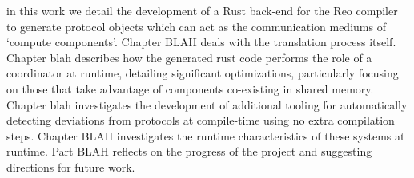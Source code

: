 {in this work we detail the development of a Rust back-end for the Reo compiler to generate protocol objects which can act as the communication mediums of `compute components'. Chapter BLAH deals with the translation process itself. Chapter blah describes how the generated rust code performs the role of a coordinator at runtime, detailing significant optimizations, particularly focusing on those that take advantage of components co-existing in shared memory. Chapter blah investigates the development of additional tooling for automatically detecting deviations from protocols at compile-time using no extra compilation steps. Chapter BLAH investigates the runtime characteristics of these systems at runtime. Part BLAH reflects on the progress of the project and suggesting directions for future work.

 }

